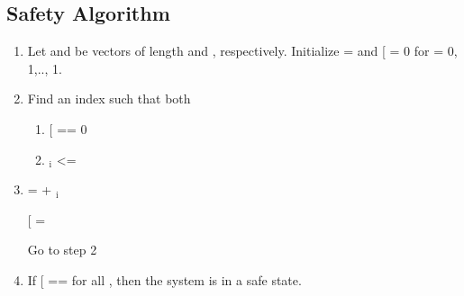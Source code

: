 \documentclass[letterpaper,10pt,english,openany,oneside]{sphinxmanual}
\begin{document}
\subsection{Safety Algorithm}
\label{\detokenize{implementation:safety-algorithm}}\begin{enumerate}
%
\item {} 
Let  and  be vectors of length  and , respectively. Initialize
 =  and  {[}\sphinxstyleemphasis{i}{]} = 0 for  = 0, 1,..,  \sphinxhyphen{} 1.

\item {} 
Find an index  such that both
\begin{enumerate}
%
\item {} 
 {[}\sphinxstyleemphasis{i}{]} == 0

\item {} 
$_{\text{i}}$ \textless{}= 

\end{enumerate}

\item {} 
 =  + $_{\text{i}}$

 {[}\sphinxstyleemphasis{i}{]} = 

Go to step 2

\item {} 
If  {[}\sphinxstyleemphasis{i}{]} ==  for all , then the system is in a safe state.

\end{enumerate}
\end{document}
